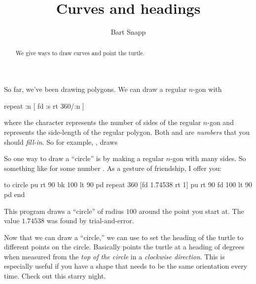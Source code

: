 \documentclass[noauthor,nooutcomes,12pt]{ximera}
\title{Curves and headings}
\author{Bart Snapp}
\begin{document}
\begin{abstract}
  We give ways to draw curves and point the turtle.
\end{abstract}
\maketitle

\nameblankgen

\begin{multicols*}{2}
  So far, we've been drawing polygons. We can draw a regular $n$-gon
  with
\begin{logo}
  repeat :n [ fd :s rt 360/:n ]
\end{logo}
where the character  represents the number of sides of the
regular $n$-gon and  represents the side-length of the regular
polygon. Both  and  are \emph{numbers} that you should
\emph{fill-in}. So for example, , draws
\begin{logoout}
\end{logoout}
So one way to draw a ``circle'' is by making a regular $n$-gon with
many sides. So something like  for some
number . As a gesture of friendship, I offer you:
\begin{logo}
to circle
pu rt 90 bk 100 lt 90 pd
repeat 360 [fd 1.74538 rt 1]
pu rt 90 fd 100 lt 90 pd
end
\end{logo}
This program draws a ``circle'' of radius $100$ around the point you
start at. The value $1.74538$ was found by trial-and-error.


Now that we can draw a ``circle,'' we can use  to set the
heading of the turtle to different points on the circle. Basically
 points the turtle at a heading of \lc{\#} degrees when
measured from the \emph{top of the circle} in a \emph{clockwise
  direction}. This is especially useful if you have a shape that needs
to be the same orientation every time. Check out this starry night.


\end{multicols*}
\end{document}
